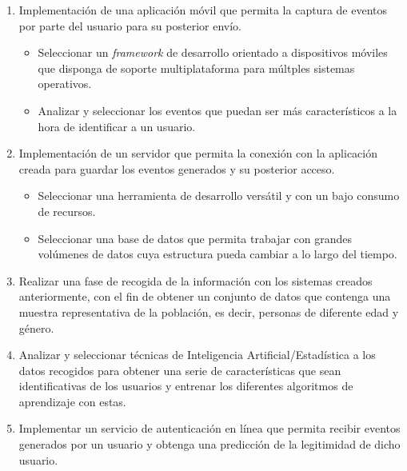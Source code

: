  \begin{enumerate}
    
\item Implementación de una aplicación móvil que permita la captura de eventos por parte del usuario para su posterior envío.
    \begin{itemize}
        
	\item Seleccionar un \textit{framework} de desarrollo orientado a dispositivos móviles que disponga de soporte multiplataforma para múltples sistemas operativos.
        
        \item Analizar y seleccionar los eventos que puedan ser más característicos a la hora de identificar a un usuario.
        
    \end{itemize}

\item Implementación de un servidor que permita la conexión con la aplicación creada para guardar los eventos generados y su posterior acceso.

    \begin{itemize}
        \item Seleccionar una herramienta de desarrollo versátil y con un bajo consumo de recursos.
        
        \item Seleccionar una base de datos que permita trabajar con grandes volúmenes de datos cuya estructura pueda cambiar a lo largo del tiempo.
        
    \end{itemize}

\item Realizar una fase de recogida de la información con los sistemas creados anteriormente, con el fin de obtener un conjunto de datos que contenga una muestra representativa de la población, es decir, personas de diferente edad y género.

\item  Analizar y seleccionar técnicas de Inteligencia Artificial/Estadística a los datos recogidos para obtener una serie de características que sean identificativas de los usuarios y entrenar los diferentes algoritmos de aprendizaje con estas.

\item Implementar un servicio de autenticación en línea que permita recibir eventos generados por un usuario y obtenga una predicción de la legitimidad de dicho usuario.
\end{enumerate}

